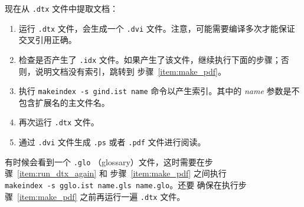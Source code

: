 \documentclass[UTF8]{ctexart}
\begin{document}
现在从 \texttt{.dtx} 文件中提取文档：
\begin{enumerate}
    \item 运行 \texttt{.dtx} 文件，会生成一个 \texttt{.dvi} 文件。注意，可能需要编译多次才能保证交叉引用正确。
    \item 检查是否产生了 \texttt{.idx} 文件。如果产生了该文件，继续执行下面的步骤；否则，说明文档没有索引，跳转到
    步骤~\ref{item:make_pdf}。
    \item 执行 \texttt{makeindex -s gind.ist name} 命令以产生索引。其中的 \emph{name} 参数是不
    包含扩展名的主文件名。
    \item \label{item:run_dtx_again} 再次运行 \texttt{.dtx} 文件。
    \item \label{item:make_pdf} 通过 \texttt{.dvi} 文件生成 \texttt{.ps} 或者 \texttt{.pdf} 文件进行阅读。
\end{enumerate}

有时候会看到一个 \texttt{.glo} （glossary）文件，这时需要在步骤~\ref{item:run_dtx_again} 和
步骤~\ref{item:make_pdf} 之间执行 \\ \texttt{makeindex -s gglo.ist name.gls name.glo}。还要
确保在执行步骤~\ref{item:make_pdf} 之前再运行一遍 \texttt{.dtx} 文件。
\end{document}
